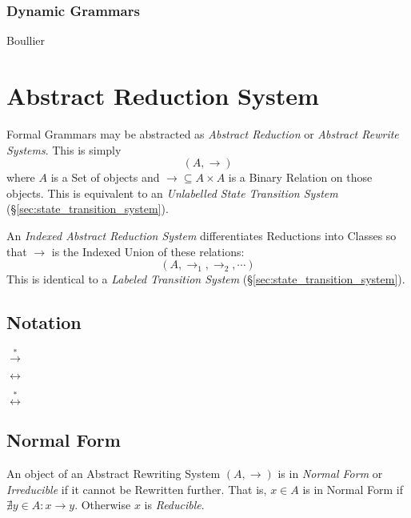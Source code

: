 \subsubsection{Dynamic Grammars}

Boullier\cite{boullier94}



\section{Abstract Reduction System}\label{sec:abstract_rewrite}

Formal Grammars may be abstracted as \emph{Abstract Reduction} or
\emph{Abstract Rewrite Systems}. This is simply
    \[(A,\rightarrow)\]
where $A$ is a Set of objects and $\rightarrow \subseteq A \times A$
is a Binary Relation on those objects. This is equivalent to an
\emph{Unlabelled State Transition System}
(\S\ref{sec:state_transition_system}).

An \emph{Indexed Abstract Reduction System} differentiates Reductions
into Classes so that $\rightarrow$ is the Indexed Union of these
relations:
    \[(A, \rightarrow_1, \rightarrow_2, \cdots)\]
This is identical to a \emph{Labeled Transition System}
(\S\ref{sec:state_transition_system}).



\subsection{Notation}\label{sec:rewrite_notation}

$\stackrel{*}{\rightarrow}$

$\leftrightarrow$

$\stackrel{*}{\leftrightarrow}$



\subsection{Normal Form}\label{sec:normal_form}

An object of an Abstract Rewriting System $(A,\rightarrow)$ is in
\emph{Normal Form} or \emph{Irreducible} if it cannot be Rewritten
further. That is, $x \in A$ is in Normal Form if $\nexists y \in A : x
\rightarrow y$. Otherwise $x$ is \emph{Reducible}.

